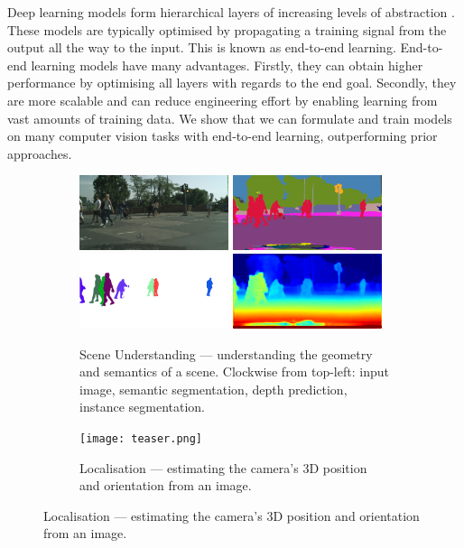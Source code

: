 Deep learning models form hierarchical layers of increasing levels of abstraction \citep{goodfellow2016deep}. These models are typically optimised by propagating a training signal from the output all the way to the input. This is known as end-to-end learning. 
End-to-end learning models have many advantages. Firstly, they can obtain higher performance by optimising all layers with regards to the end goal. Secondly, they are more scalable and can reduce engineering effort by enabling learning from vast amounts of training data. We show that we can formulate and train models on many computer vision tasks with end-to-end learning, outperforming prior approaches.

\begin{figure}[t]
\centering
    \begin{subfigure}[b]{0.65\textwidth}
\centering
        \includegraphics[width=0.48\textwidth,trim={0 20mm 0 0},clip]{segnet_114_output_0.jpg}
        \includegraphics[width=0.48\textwidth,trim={0 20mm 0 0},clip]{segnet_114_output_1.png} \\
        \includegraphics[width=0.48\textwidth,trim={0 20mm 0 0},clip]{segnet_114_output_3.png}
        \includegraphics[width=0.48\textwidth,trim={0 20mm 0 0},clip]{segnet_114_output_4.png}
        \caption{Scene Understanding --- understanding the geometry and semantics of a scene. Clockwise from top-left: input image, semantic segmentation, depth prediction, instance segmentation.}
    \end{subfigure}
    \quad
    \begin{subfigure}[b]{0.3\textwidth}
\centering
        \texttt{[image: teaser.png]}
        \caption{Localisation --- estimating the camera's 3D position and orientation from an image.}
    \end{subfigure}
    

\end{figure}
